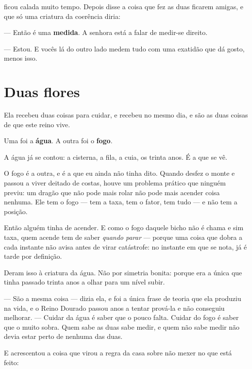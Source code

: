 \documentclass[livro.tex]{subfiles}
\begin{document}
\medskip

\Yas ficou calada muito tempo. Depois disse a coisa que fez as duas ficarem amigas, e que só uma
criatura da coerência diria:

--- Então é uma \textbf{medida}. A senhora está a falar de medir-se direito.

--- Estou. E vocês lá do outro lado medem tudo com uma exatidão que dá gosto, menos isso.

\section{Duas flores}

Ela recebeu duas coisas para cuidar, e recebeu no mesmo dia, e são as duas coisas de que este
reino vive.

Uma foi a \textbf{água}. A outra foi o \textbf{fogo}.

\medskip

A água já se contou: a cisterna, a fila, a cuia, os trinta anos. É a que se vê.

O fogo é a outra, e é a que eu ainda não tinha dito. Quando \Ven desfez o monte e passou
a viver deitado de costas, houve um problema prático que ninguém previu: um dragão que não pode
mais rolar não pode mais acender coisa nenhuma. Ele tem o fogo --- tem a taxa, tem o fator, tem
tudo --- e não tem a posição.

Então alguém tinha de acender. E como o fogo daquele bicho não é chama e sim taxa, quem acende
tem de saber \emph{quando parar} --- porque uma coisa que dobra a cada instante não avisa antes
de virar catástrofe: no instante em que se nota, já é tarde por definição.

Deram isso à criatura da água. Não por simetria bonita: porque era a única que tinha passado
trinta anos a olhar para um nível subir.

\medskip

--- São a mesma coisa --- dizia ela, e foi a única frase de teoria que ela produziu na vida, e o
Reino Dourado passou anos a tentar prová-la e não conseguiu melhorar. --- Cuidar da água é saber
que o pouco falta. Cuidar do fogo é saber que o muito sobra. Quem sabe as duas sabe medir, e
quem não sabe medir não devia estar perto de nenhuma das duas.

\medskip

E acrescentou a coisa que virou a regra da casa sobre não mexer no que está feito:
\end{document}
